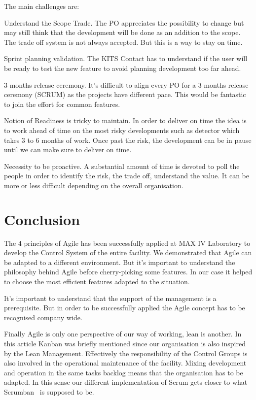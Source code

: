 \documentclass[a4paper,
              ]{jacow}
\begin{document}
The main challenges are:
\begin{Itemize}
      \item Understand the Scope Trade.
      The PO appreciates the possibility to change but may still think that the development will be done as an addition to the scope. The trade off system is not always accepted. But this is a way to stay on time.
      \item Sprint planning validation.
      The KITS Contact has to understand if the user will be ready to test the new feature to avoid planning development too far ahead.
      \item 3 months release ceremony.
      It's difficult to align every PO for a 3 months release ceremony (SCRUM) as the projects have different pace. This would be fantastic to join the effort for common features.
      \item Notion of Readiness is tricky to maintain.
      In order to deliver on time the idea is to work ahead of time on the most risky developments such as detector which takes 3 to 6 months of work. Once past the risk, the development can be in pause until we can make sure to deliver on time.
      \item Necessity to be proactive.
      A substantial amount of time is devoted to poll the people in order to identify the risk, the trade off, understand the value. It can be more or less difficult depending on the overall organisation.
\end{Itemize}

\section{Conclusion}
The 4 principles of Agile has been successfully applied at MAX IV Laboratory to develop the Control System of the entire facility. We demonstrated that Agile can be adapted to a different environment.
But it's important to understand the philosophy behind Agile before cherry-picking some features. In our case it helped to choose the most efficient features adapted to the situation.

It's important to understand that the support of the management is a prerequisite. But in order to be successfully applied the Agile concept has to be recognised company wide. 

Finally Agile is only one perspective of our way of working, lean is another. In this article Kanban was briefly mentioned since our organisation is also inspired by the Lean Management. Effectively the responsibility of the Control Groups is also involved in the operational maintenance of the facility. Mixing development and operation in the same tasks backlog means that the organisation has to be adapted. In this sense our different implementation of Scrum gets closer to what Scrumban~\cite{scrumban} is supposed to be.
\end{document}
